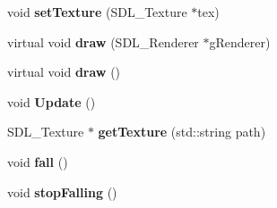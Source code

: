 \begin{DoxyCompactItemize}
\item 
\hypertarget{class_game_object_a0872c027418d59fa7cb3385c0157331c}{}void {\bfseries set\+Texture} (S\+D\+L\+\_\+\+Texture $\ast$tex)\label{class_game_object_a0872c027418d59fa7cb3385c0157331c}

\item 
\hypertarget{class_game_object_a149810a726d5f0f0928e3cc1e2f35caa}{}virtual void {\bfseries draw} (S\+D\+L\+\_\+\+Renderer $\ast$g\+Renderer)\label{class_game_object_a149810a726d5f0f0928e3cc1e2f35caa}

\item 
\hypertarget{class_game_object_abb64143e72358beb808db22182517802}{}virtual void {\bfseries draw} ()\label{class_game_object_abb64143e72358beb808db22182517802}

\item 
\hypertarget{class_game_object_a1bd14aa169f501f94f1721943d716535}{}void {\bfseries Update} ()\label{class_game_object_a1bd14aa169f501f94f1721943d716535}

\item 
\hypertarget{class_game_object_a02f615d4d777a5542f7bcb757462d212}{}S\+D\+L\+\_\+\+Texture $\ast$ {\bfseries get\+Texture} (std\+::string path)\label{class_game_object_a02f615d4d777a5542f7bcb757462d212}

\item 
\hypertarget{class_game_object_ae726f13a135d68908628299d702c88f4}{}void {\bfseries fall} ()\label{class_game_object_ae726f13a135d68908628299d702c88f4}

\item 
\hypertarget{class_game_object_a759f927dbbb6e388acb332bbe76ded59}{}void {\bfseries stop\+Falling} ()\label{class_game_object_a759f927dbbb6e388acb332bbe76ded59}

\end{DoxyCompactItemize}
